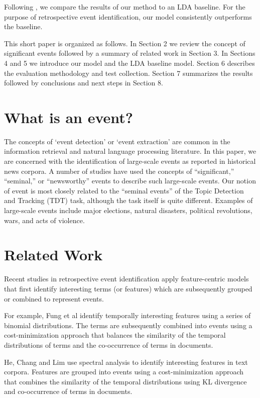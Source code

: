 \documentclass{sig-alternate}
\begin{document}
Following \cite{Weng2011}, we compare the results of our method to an LDA baseline. For the purpose of retrospective event identification, our model consistently outperforms the baseline.

This short paper is organized as follows. In Section 2 we review the concept of significant events followed by a summary of related work in Section 3. In Sections 4 and 5 we introduce our model and the LDA baseline model. Section 6 describes the evaluation methodology and test collection. Section 7 summarizes the results followed by conclusions and next steps in Section 8.

\section{What is an event?}

The concepts of `event detection' or `event extraction' are common in the information retrieval and natural language processing literature. In this paper, we are concerned with the identification of large-scale events as reported in historical news corpora. A number of studies have used the concepts of ``significant,'' ``seminal,'' or ``newsworthy'' events to describe such large-scale events.  Our notion of event is most closely related to the ``seminal events'' of the Topic Detection and Tracking (TDT) task, although the task itself is quite different. Examples of large-scale events include major elections, natural disasters, political revolutions, wars, and acts of violence.


\section{Related Work}

Recent studies in retrospective event identification apply feature-centric models \cite{Yi, Fung2005, Chen2009, Teng2008, Weng2011} that first identify interesting terms (or features) which are subsequently grouped or combined to represent events. 

For example, Fung et al \cite{Fung2005} identify temporally interesting features using a series of binomial distributions. The terms are subsequently combined  into events using a cost-minimization approach that balances the similarity of the temporal distributions of terms and the co-occurrence of terms in documents. 

He, Chang and Lim \cite{He2007} use spectral analysis to identify interesting features in text corpora. Features are grouped into events using a cost-minimization approach that combines the similarity of the temporal distributions using KL divergence and co-occurrence of terms in documents. 
\end{document}
